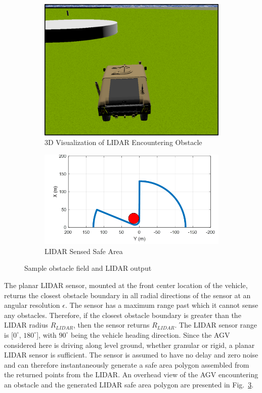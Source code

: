 \documentclass[12pt,twocolumn]{article}
\begin{document}
\begin{figure}
	\centering
	\begin{subfigure}[b]{\columnwidth}
		\centering
		\includegraphics[width=0.8\columnwidth]{Figs/incomingObst.png}
		\caption{{\small 3D Visualization of LIDAR Encountering Obstacle}}   
		\label{fig:obstacle_field_3D}
	\end{subfigure}
	\hfill
	\begin{subfigure}[b]{\columnwidth}
		\centering
		\includegraphics[width=\columnwidth]{Figs/obstLIDAR.png}
		\caption{\small LIDAR Sensed Safe Area}   
		\label{fig:obstacle_field_LIDAR}
	\end{subfigure}
	\caption{\small Sample obstacle field and LIDAR output}
	\label{fig:LIDARExample}
\end{figure}

The planar LIDAR sensor, mounted at the front center location of the vehicle, returns the closest obstacle boundary in all radial directions of the sensor at an angular resolution $\epsilon$. The sensor has a maximum range past which it cannot sense any obstacles. Therefore, if the closest obstacle boundary is greater than the LIDAR radius $R_{LIDAR}$, then the sensor returns $R_{LIDAR}$. The LIDAR sensor range is [$0^\circ$, $180^\circ$], with $90^\circ$ being the vehicle heading direction. Since the AGV considered here is driving along level ground, whether granular or rigid, a planar LIDAR sensor is sufficient. The sensor is assumed to have no delay and zero noise and can therefore instantaneously generate a safe area polygon assembled from the returned points from the LIDAR. An overhead view of the AGV encountering an obstacle and the generated LIDAR safe area polygon are presented in Fig.~\ref{fig:LIDARExample}. 
%
\end{document}
